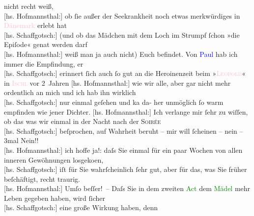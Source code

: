                     nicht recht weiß, {\\}{[}hs. Hofmannsthal:{]} ob ſie außer der Seekrankheit noch
                    etwas merkwürdiges in \textcolor{pink}{Dänemark}{}\ledrightnote{\textcolor{pink}{Dänemark}} erlebt hat
                        {\\}{[}hs. Schaffgotsch:{]}  (und ob das Mädchen mit dem Loch im Strumpf
                    ſchon »die Epiſode« gena{\geminationn}t werden darf {\\}{[}hs. Hofmannsthal:{]} weiß man ja auch nicht) Euch befindet.\pend
           \pstart
           Von \textcolor{blue}{Paul}{}\ledrightnote{\textcolor{blue}{Paul Goldmann}} hab ich immer die Empfindung, er
                        {\\}{[}hs. Schaffgotsch:{]} erinnert ſich auch ſo gut an die Heroinenzeit
                    beim »\textcolor{pink}{\textsc{Leopold}}{}\ledrightnote{\textcolor{pink}{Hotel und Pension Rudolfshöhe (Leopold Petter)}}« in \textcolor{pink}{\textsc{Ischl}}{}\ledrightnote{\textcolor{pink}{Bad Ischl}} vor 2 Jahren \pend
           \pstart
           {\pb}{[}hs. Hofmannsthal:{]} wie wir alle, aber gar nicht mehr ordentlich an mich
                    und ich hab ihn wirklich {\\}{[}hs. Schaffgotsch:{]} nur einmal geſehen und ka{\geminationn} da- her unmöglich ſo warm empfinden wie jener
                    Dichter.\pend
           \pstart
           {[}hs. Hofmannsthal:{]} Ich verlange mir ſehr zu wiſſen, ob das was wir
                    einmal in der Nacht nach der \textsc{Soirée}{\\}{[}hs. Schaffgotsch:{]} beſprochen, auf Wahrheit beruht – mir will ſcheinen
                    – nein – 3mal Nein!! {\\}{[}hs. Hofmannsthal:{]} ich hoffe ja!: daſs Sie einmal
                    für ein paar Wochen von allen inneren Gewöhnungen losgeko{\geminationm}en, {\\}{[}hs. Schaffgotsch:{]} iſt für Sie
                    wahrſcheinlich ſehr gut, aber \introOben{}für\introOben{} das, was Sie früher
                    beſchäftigt, recht traurig. {\\}{[}hs. Hofmannsthal:{]} Umſo beſſer! – Daſs Sie
                    in dem zweiten \textcolor{green}{Act}{} dem \textcolor{green}{Mädel}{} mehr Leben gegeben
                    haben, wird ſicher {\\}{[}hs. Schaffgotsch:{]} eine große Wirkung haben, denn
